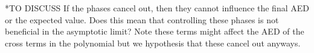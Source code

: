 \documentclass[12pt,a4paper]{article}
\begin{document}
\item
*TO DISCUSS If the phases cancel out, then they cannot influence the final AED or the expected value. Does this mean that controlling these phases is not beneficial in the asymptotic limit?
Note these terms might affect the AED of the cross terms in the polynomial but we hypothesis that these cancel out anyways.



\end{document}
